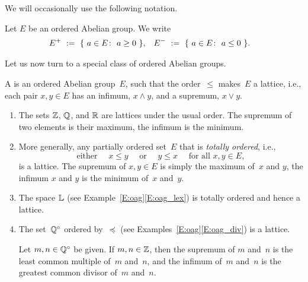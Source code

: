 \documentclass[main.tex]{subfiles}
\begin{document}
%
%
\noindent
We will occasionally use the following notation.
\begin{dfn}
Let $E$ be an ordered Abelian group.
We write
\begin{align*}
E^+ \ &:=\ \{\  a\in E\colon\  a\geq 0\ \},&
E^- \ &:=\ \{\  a\in E\colon\  a\leq 0\ \}.
\end{align*}
\end{dfn}
%
\noindent
Let us now turn to a special class of ordered Abelian groups.
%
%
\begin{dfn}
\label{D:loag}
A 
is an ordered Abelian group~$E$,
such that the order~$\leq$ 
makes~$E$ a lattice,
i.e., each pair $x,y\in E$
has an infimum, $x\wedge y$,
and a supremum, $x\vee y$.
\end{dfn}
\begin{exs}
\label{E:loag}
\begin{enumerate}
\item
The sets
$\mathbb{Z}$, $\mathbb{Q}$, and $\mathbb{R}$ are lattices
under the usual order.
The supremum of two elements is their maximum,
the infimum is the minimum.

\item
More generally,
any partially ordered set~$E$
that is \emph{totally ordered},
i.e.,
\begin{equation*}
\text{either } \quad x\leq y\quad\text{ or } 
\quad y\leq x\quad \text{ for all }x,y\in E,
\end{equation*}
is a lattice.
The supremum of $x,y\in E$ is simply the maximum of~$x$ and $y$,
the infimum $x$ and $y$ is the minimum of~$x$ and~$y$.

\item
The space $\mathbb{L}$
(see Example~\ref{E:oag}\ref{E:oag_lex})
is totally ordered and hence a lattice.

\item
\label{E:loag_div}
The set~$\mathbb{Q}^\circ$ ordered by~$\preccurlyeq$
(see Examples~\ref{E:oag}\ref{E:oag_div})
is a lattice.

Let $m,n\in \mathbb{Q}^\circ$ be given.
If $m,n\in \mathbb{Z}$, then the supremum of $m$ and~$n$
is the least common multiple of~$m$ and~$n$,
and the infimum of~$m$ and~$n$ is the greatest common divisor
of~$m$ and~$n$.

\end{enumerate}
\end{exs}
\end{document}
